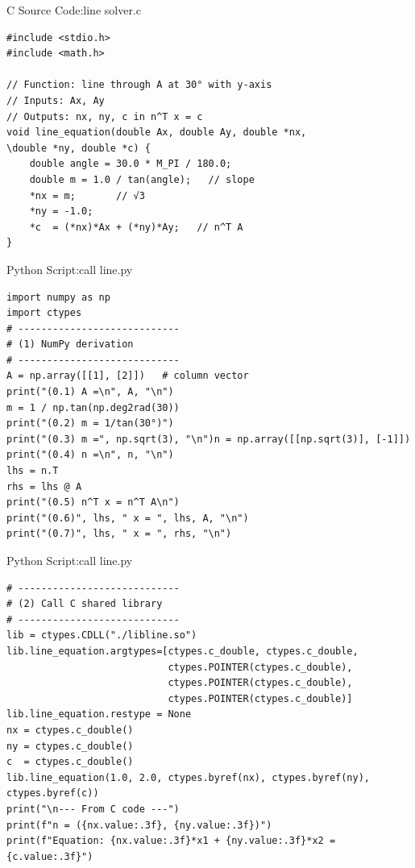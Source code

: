 \documentclass{beamer}
\numberwithin{equation}{section}
\theoremstyle{remark}
\begin{document}
\begin{frame}[fragile]{C Source Code:line solver.c}
\begin{verbatim}
#include <stdio.h>
#include <math.h>

// Function: line through A at 30° with y-axis
// Inputs: Ax, Ay
// Outputs: nx, ny, c in n^T x = c
void line_equation(double Ax, double Ay, double *nx, 
\double *ny, double *c) {
    double angle = 30.0 * M_PI / 180.0;
    double m = 1.0 / tan(angle);   // slope
    *nx = m;       // √3
    *ny = -1.0;
    *c  = (*nx)*Ax + (*ny)*Ay;   // n^T A
}
\end{verbatim}
\end{frame}

\begin{frame}[fragile]{Python Script:call line.py}
\begin{verbatim}
import numpy as np
import ctypes
# ----------------------------
# (1) NumPy derivation
# ----------------------------
A = np.array([[1], [2]])   # column vector
print("(0.1) A =\n", A, "\n")
m = 1 / np.tan(np.deg2rad(30))
print("(0.2) m = 1/tan(30°)")
print("(0.3) m =", np.sqrt(3), "\n")n = np.array([[np.sqrt(3)], [-1]])
print("(0.4) n =\n", n, "\n")
lhs = n.T
rhs = lhs @ A
print("(0.5) n^T x = n^T A\n")
print("(0.6)", lhs, " x = ", lhs, A, "\n")
print("(0.7)", lhs, " x = ", rhs, "\n")
\end{verbatim}
\end{frame}
\begin{frame}[fragile]{Python Script:call line.py}
\begin{verbatim}
# ----------------------------
# (2) Call C shared library
# ----------------------------
lib = ctypes.CDLL("./libline.so")
lib.line_equation.argtypes=[ctypes.c_double, ctypes.c_double,
                            ctypes.POINTER(ctypes.c_double),
                            ctypes.POINTER(ctypes.c_double),
                            ctypes.POINTER(ctypes.c_double)]
lib.line_equation.restype = None
nx = ctypes.c_double()
ny = ctypes.c_double()
c  = ctypes.c_double()
lib.line_equation(1.0, 2.0, ctypes.byref(nx), ctypes.byref(ny), ctypes.byref(c))
print("\n--- From C code ---")
print(f"n = ({nx.value:.3f}, {ny.value:.3f})")
print(f"Equation: {nx.value:.3f}*x1 + {ny.value:.3f}*x2 = {c.value:.3f}")

\end{verbatim}
\end{frame}
\end{document}
